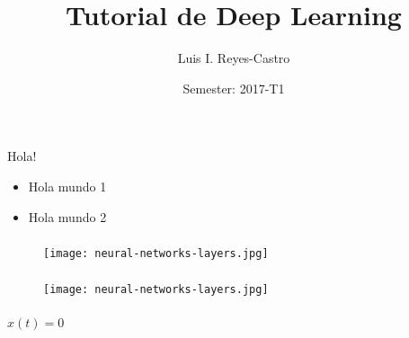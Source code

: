 \documentclass[ 10pt, xcolor = dvipsnames]{beamer}
\title[\shorttitle]{Tutorial de Deep Learning}
\author[L. I. Reyes-Castro]{Luis I. Reyes-Castro}
\institute[ESPOL]{\normalsize Escuela Superior Polit\'ecnica del Litoral (ESPOL) \\ Guayaquil - Ecuador}
\date[2017-T1]{Semester: 2017-T1}
\begin{document}
%
%


\begin{frame}[allowframebreaks]
\frametitle{\insertsection}

Hola!
\begin{itemize}
\item Hola mundo 1
\item Hola mundo 2
\end{itemize}

\end{frame}

\begin{frame}[allowframebreaks]
\frametitle{\insertsection}

\begin{figure}
\centering
\texttt{[image: neural-networks-layers.jpg]}
\end{figure}

\end{frame}

\begin{frame}[allowframebreaks]
\frametitle{\insertsection}

\begin{figure}
\centering
\texttt{[image: neural-networks-layers.jpg]}
\end{figure}

\end{frame}

\begin{frame}[allowframebreaks]
\frametitle{\insertsection}

$x(t) = 0$

\end{frame}
\end{document}

